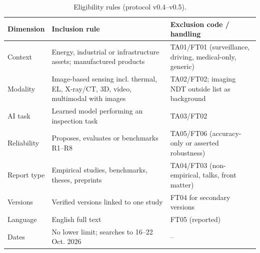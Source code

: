 \documentclass[journal]{IEEEtran}
\begin{document}
\begin{table}[t]
\caption{Eligibility rules (protocol v0.4--v0.5).}
\label{tab:eligibility}
\centering\footnotesize
\begin{tabularx}{\columnwidth}{p{}YY}
\toprule
Dimension & Inclusion rule & Exclusion code / handling \\
\midrule
Context & Energy, industrial or infrastructure assets; manufactured products & TA01/FT01 (surveillance, driving, medical-only, generic) \\
Modality & Image-based sensing incl. thermal, EL, X-ray/CT, 3D, video, multimodal with images & TA02/FT02; imaging NDT outside list as background \\
AI task & Learned model performing an inspection task & TA03/FT02 \\
Reliability & Proposes, evaluates or benchmarks R1--R8 & TA05/FT06 (accuracy-only or asserted robustness) \\
Report type & Empirical studies, benchmarks, theses, preprints & TA04/FT03 (non-empirical, talks, front matter) \\
Versions & Verified versions linked to one study & FT04 for secondary versions \\
Language & English full text & FT05 (reported) \\
Dates & No lower limit; searches to 16--22 Oct. 2026 & -- \\
\bottomrule
\end{tabularx}
\end{table}
\end{document}
